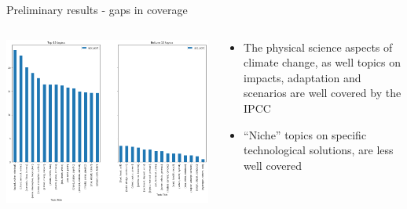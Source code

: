 \documentclass[9pt]{beamer}
\begin{document}
\begin{frame}{Preliminary results - gaps in coverage}

\begin{columns}
	\begin{column}{0.6\linewidth}
		\begin{center}
			\includegraphics[width=\linewidth]{../plots/ipcc_topics_65.png}
		\end{center}
	\end{column}
	\begin{column}{0.4\linewidth}
		\begin{center}
			\begin{itemize}
				\item The physical science aspects of climate change, as well topics on impacts, adaptation and scenarios are well covered by the IPCC
				\item ``Niche'' topics on specific technological solutions, are less well covered
			\end{itemize}
		\end{center}
	\end{column}
\end{columns}

\end{frame}
\end{document}
